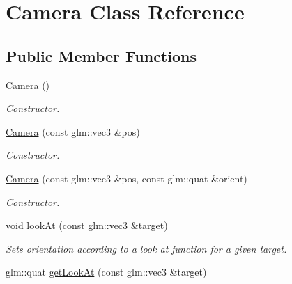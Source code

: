 \hypertarget{class_camera}{\section{Camera Class Reference}
\label{class_camera}
}
\subsection*{Public Member Functions}
\begin{DoxyCompactItemize}
\item 
\hypertarget{class_camera_a01f94c3543f56ede7af49dc778f19331}{\hyperlink{class_camera_a01f94c3543f56ede7af49dc778f19331}{Camera} ()}\label{class_camera_a01f94c3543f56ede7af49dc778f19331}

\begin{DoxyCompactList}\small\item\em Constructor. \end{DoxyCompactList}\item 
\hypertarget{class_camera_acee2a1b3d56b0f141a3c6ee82735ed39}{\hyperlink{class_camera_acee2a1b3d56b0f141a3c6ee82735ed39}{Camera} (const glm\+::vec3 \&pos)}\label{class_camera_acee2a1b3d56b0f141a3c6ee82735ed39}

\begin{DoxyCompactList}\small\item\em Constructor. \end{DoxyCompactList}\item 
\hypertarget{class_camera_a9e5dda23dca2ae363424f7a9025f55c9}{\hyperlink{class_camera_a9e5dda23dca2ae363424f7a9025f55c9}{Camera} (const glm\+::vec3 \&pos, const glm\+::quat \&orient)}\label{class_camera_a9e5dda23dca2ae363424f7a9025f55c9}

\begin{DoxyCompactList}\small\item\em Constructor. \end{DoxyCompactList}\item 
\hypertarget{class_camera_aec0442093303b9568a159f8c87f8b7d8}{void \hyperlink{class_camera_aec0442093303b9568a159f8c87f8b7d8}{look\+At} (const glm\+::vec3 \&target)}\label{class_camera_aec0442093303b9568a159f8c87f8b7d8}

\begin{DoxyCompactList}\small\item\em Sets orientation according to a look at function for a given target. \end{DoxyCompactList}\item 
\hypertarget{class_camera_a963fa4d081fe59425d6b939c4aa9853d}{glm\+::quat \hyperlink{class_camera_a963fa4d081fe59425d6b939c4aa9853d}{get\+Look\+At} (const glm\+::vec3 \&target)}\label{class_camera_a963fa4d081fe59425d6b939c4aa9853d}


\end{DoxyCompactItemize}
